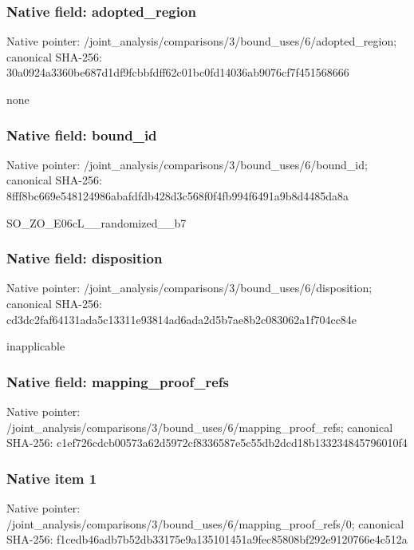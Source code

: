 \documentclass[10pt,a4paper]{article}
\begin{document}
\subsubsection{Native field: adopted\_region}


Native pointer: /joint\_analysis/comparis\allowbreak{}ons/3/bound\_uses/6/adopt\allowbreak{}ed\_region; canonical SHA-256: 30a0924a3360be687d1df9fc\allowbreak{}bbfdff62c01bc0fd14036ab9\allowbreak{}076cf7f451568666


none


\subsubsection{Native field: bound\_id}


Native pointer: /joint\_analysis/comparis\allowbreak{}ons/3/bound\_uses/6/bound\allowbreak{}\_id; canonical SHA-256: 8fff8bc669e548124986abaf\allowbreak{}dfdb428d3c568f0f4fb994f6\allowbreak{}491a9b8d4485da8a


SO\_ZO\_E06cL\_\_randomized\_\_b7


\subsubsection{Native field: disposition}


Native pointer: /joint\_analysis/comparis\allowbreak{}ons/3/bound\_uses/6/dispo\allowbreak{}sition; canonical SHA-256: cd3dc2faf64131ada5c13311\allowbreak{}e93814ad6ada2d5b7ae8b2c0\allowbreak{}83062a1f704cc84e


inapplicable


\subsubsection{Native field: mapping\_proof\_refs}


Native pointer: /joint\_analysis/comparis\allowbreak{}ons/3/bound\_uses/6/mappi\allowbreak{}ng\_proof\_refs; canonical SHA-256: c1ef726cdcb00573a62d5972\allowbreak{}cf8336587e5c55db2dcd18b1\allowbreak{}33234845796010f4



\subsubsection{Native item 1}


Native pointer: /joint\_analysis/comparis\allowbreak{}ons/3/bound\_uses/6/mappi\allowbreak{}ng\_proof\_refs/0; canonical SHA-256: f1cedb46adb7b52db33175e9\allowbreak{}a135101451a9fec85808bf29\allowbreak{}2e9120766e4c512a
\end{document}

